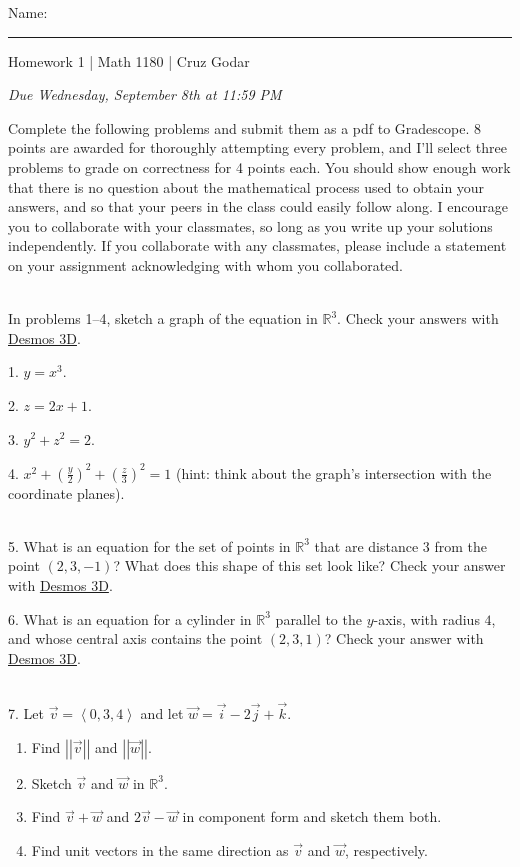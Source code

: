 \documentclass{article}
\begin{document}
\Large Name: \rule{2in}{0.15mm} \hfill Homework 1 | Math 1180 | Cruz Godar \vspace{4pt} \normalsize

\textit{Due Wednesday, September 8th at 11:59 PM}

Complete the following problems and submit them as a pdf to Gradescope. 8 points are awarded for thoroughly attempting every problem, and I'll select three problems to grade on correctness for 4 points each. You should show enough work that there is no question about the mathematical process used to obtain your answers, and so that your peers in the class could easily follow along. I encourage you to collaborate with your classmates, so long as you write up your solutions independently. If you collaborate with any classmates, please include a statement on your assignment acknowledging with whom you collaborated.

~\\

In problems 1--4, sketch a graph of the equation in $\mathbb{R}^3$. Check your answers with \href{https://www.desmos.com/3d}{Desmos 3D}.

1. $\displaystyle y = x^3$.

2. $\displaystyle z = 2x + 1$.

3. $\displaystyle y^2 + z^2 = 2$.

4. $\displaystyle x^2 + \left( \frac{y}{2} \right)^2 + \left( \frac{z}{3} \right)^2 = 1$ (hint: think about the graph's intersection with the coordinate planes).

~\\

5. What is an equation for the set of points in $\mathbb{R}^3$ that are distance $3$ from the point $(2, 3, -1)$? What does this shape of this set look like? Check your answer with \href{https://www.desmos.com/3d}{Desmos 3D}.

6. What is an equation for a cylinder in $\mathbb{R}^3$ parallel to the $y$-axis, with radius $4$, and whose central axis contains the point $(2, 3, 1)$? Check your answer with \href{https://www.desmos.com/3d}{Desmos 3D}.

~\\

7. Let $\vec{v} = \left< 0, 3, 4 \right>$ and let $\vec{w} = \vec{i} - 2\vec{j} + \vec{k}$.

\begin{enumerate}

	\item Find $\left| \left| \vec{v} \right| \right|$ and $\left| \left| \vec{w} \right| \right|$.

	\item Sketch $\vec{v}$ and $\vec{w}$ in $\mathbb{R}^3$.

	\item Find $\vec{v} + \vec{w}$ and $2\vec{v} - \vec{w}$ in component form and sketch them both.

	\item Find unit vectors in the same direction as $\vec{v}$ and $\vec{w}$, respectively.

\end{enumerate}
\end{document}
